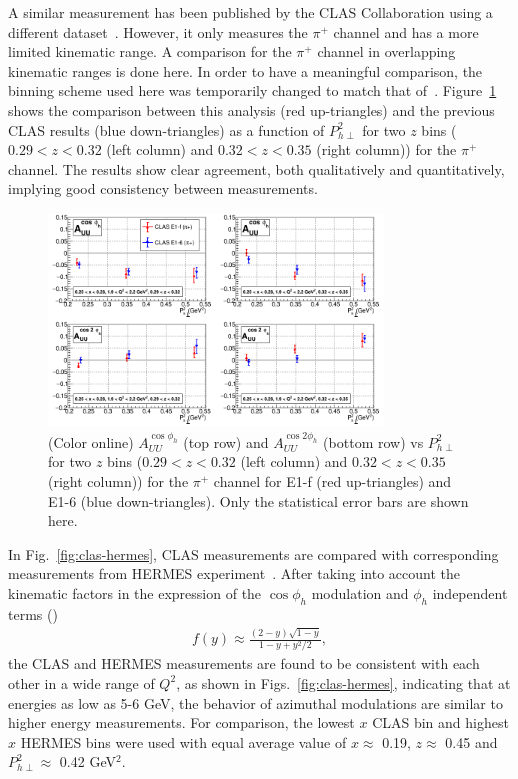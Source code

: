\documentclass[aps,prl,twocolumn,showpacs,superscriptaddress,groupedaddress]{revtex4-1}  %
\newcommand{\Phperp}{P_{h\perp}}
\newcommand{\xbj}{x}
\begin{document}
A similar measurement has been published by the CLAS Collaboration using a different dataset~\cite{Osipenko:2008rv}.
However, it only measures the $\pi^+$ channel and has a more limited kinematic range.
A comparison for the $\pi^+$ channel in overlapping kinematic ranges is done here.
In order to have a meaningful comparison, the binning scheme used here was temporarily changed to match that of~\cite{Osipenko:2008rv}.
Figure~\ref{fig:osipenkoComparisonVPT2_2zBins} shows the comparison between this analysis (red up-triangles) and the previous CLAS results (blue down-triangles) as a function of $\Phperp^2$ for two $z$ bins ($0.29 < z < 0.32$ (left column) and $0.32 < z < 0.35$ (right column)) for the $\pi^+$ channel.
The results show clear agreement, both qualitatively and quantitatively, implying good consistency between measurements.
%
\begin{figure}[htp]
\centering
\includegraphics[width=3.5in]{plots/osipenkoComparisonVPT2_2zBins.png}
\caption{(Color online) $A_{UU}^{\cos \phi_h}$ (top row) and $A_{UU}^{\cos 2\phi_h}$ (bottom row) vs $P_{h\perp}^2$ for two $z$ bins ($0.29 < z < 0.32$ (left column) and $0.32 < z < 0.35$ (right column)) for the $\pi^+$ channel for E1-f (red up-triangles) and E1-6 (blue down-triangles). Only the statistical error bars are shown here.}
\label{fig:osipenkoComparisonVPT2_2zBins}
\end{figure}

In Fig.~\ref{fig:clas-hermes}, CLAS measurements are compared with corresponding measurements from HERMES experiment~\cite{Airapetian:2012yg}.
After taking into account the kinematic factors in the expression
of the $\cos\phi_h$ modulation and $\phi_h$ independent terms (\cite{Bacchetta:2006tn})
\begin{eqnarray}
f(y)\approx \frac{(2-y)\sqrt{1-y}}{1-y+y^{2}/2} ,
\label{fy}
\end{eqnarray}
the CLAS and HERMES measurements are found to 
be consistent with each other in a wide range of $Q^2$, as shown in Figs.~\ref{fig:clas-hermes}, indicating that at energies as low as 5-6 GeV, the
behavior of azimuthal modulations are similar to higher energy measurements. 
For comparison, the lowest $\xbj$ CLAS bin and highest $\xbj$ HERMES bins were used with equal average value of $\xbj\approx$ 0.19, $z\approx$ 0.45 and $\Phperp^2 \approx$ 0.42 GeV$^2$.
\end{document}
